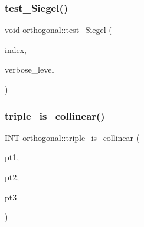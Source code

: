 \mbox{\label{classorthogonal_ad6d248c572d92abe41416065addd4a69}} 
\subsubsection{\texorpdfstring{test\+\_\+\+Siegel()}{test\_Siegel()}}
{\footnotesize\ttfamily void orthogonal\+::test\+\_\+\+Siegel (\begin{DoxyParamCaption}\item[{\mbox{\hyperlink{galois_8h_a09fddde158a3a20bd2dcadb609de11dc}{I\+NT}}}]{index,  }\item[{\mbox{\hyperlink{galois_8h_a09fddde158a3a20bd2dcadb609de11dc}{I\+NT}}}]{verbose\+\_\+level }\end{DoxyParamCaption})}

\mbox{\label{classorthogonal_a85cf2656074b3977032a6bf975475b37}} 
\subsubsection{\texorpdfstring{triple\+\_\+is\+\_\+collinear()}{triple\_is\_collinear()}}
{\footnotesize\ttfamily \mbox{\hyperlink{galois_8h_a09fddde158a3a20bd2dcadb609de11dc}{I\+NT}} orthogonal\+::triple\+\_\+is\+\_\+collinear (\begin{DoxyParamCaption}\item[{\mbox{\hyperlink{galois_8h_a09fddde158a3a20bd2dcadb609de11dc}{I\+NT}}}]{pt1,  }\item[{\mbox{\hyperlink{galois_8h_a09fddde158a3a20bd2dcadb609de11dc}{I\+NT}}}]{pt2,  }\item[{\mbox{\hyperlink{galois_8h_a09fddde158a3a20bd2dcadb609de11dc}{I\+NT}}}]{pt3 }\end{DoxyParamCaption})}

\mbox{\label{classorthogonal_a319ef460cdfe3247d336c3fb482901eb}} 
